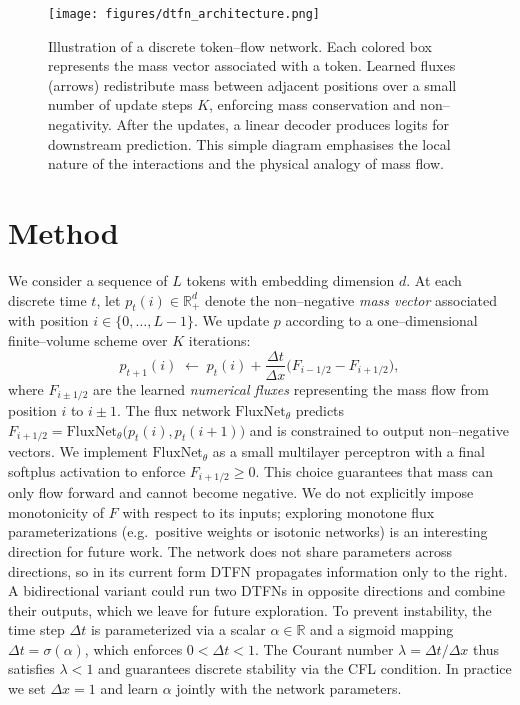 \documentclass[10pt]{article}
\begin{document}
\begin{figure}[t]
  \centering
  \texttt{[image: figures/dtfn\_architecture.png]}
  \caption{Illustration of a discrete token--flow network.  Each colored
    box represents the mass vector associated with a token.  Learned
    fluxes (arrows) redistribute mass between adjacent positions over a
    small number of update steps $K$, enforcing mass conservation and
    non--negativity.  After the updates, a linear decoder produces
    logits for downstream prediction.  This simple diagram emphasises
    the local nature of the interactions and the physical analogy of
    mass flow.}
  \label{fig:architecture}
\end{figure}


\section{Method}

We consider a sequence of $L$ tokens with embedding dimension $d$.
At each discrete time $t$, let $p_t(i)\in\mathbb{R}_+^d$ denote the non--negative
\emph{mass vector} associated with position $i\in\{0,\dots,L-1\}$.
We update $p$ according to a one--dimensional finite--volume scheme over
$K$ iterations:
\begin{equation}
  p_{t+1}(i) \;\leftarrow\; p_t(i) + \frac{\Delta t}{\Delta x}\bigl(F_{i-1/2} - F_{i+1/2}\bigr),
  \label{eq:update}
\end{equation}
where $F_{i\pm1/2}$ are the learned \emph{numerical fluxes} representing the
mass flow from position $i$ to $i\pm1$.  The flux network
$\mathrm{FluxNet}_\theta$ predicts $F_{i+1/2}= \mathrm{FluxNet}_\theta\bigl(p_t(i), p_t(i+1)\bigr)$
and is constrained to output non--negative vectors.  We implement
$\mathrm{FluxNet}_\theta$ as a small multilayer perceptron with a final
softplus activation to enforce $F_{i+1/2}\ge 0$.  This choice guarantees
that mass can only flow forward and cannot become negative.  We do not
explicitly impose monotonicity of $F$ with respect to its inputs; exploring
monotone flux parameterizations (e.g.~positive weights or isotonic
networks) is an interesting direction for future work.  The network does
not share parameters across directions, so in its current form DTFN
propagates information only to the right.  A bidirectional variant could
run two DTFNs in opposite directions and combine their outputs, which we
leave for future exploration.  To prevent instability, the time step $\Delta t$ is
parameterized via a scalar $\alpha\in\mathbb{R}$ and a sigmoid mapping
$\Delta t = \sigma(\alpha)$, which enforces $0<\Delta t<1$.  The Courant
number $\lambda=\Delta t/\Delta x$ thus satisfies $\lambda<1$ and
guarantees discrete stability via the CFL condition.  In practice we set
$\Delta x=1$ and learn $\alpha$ jointly with the network parameters.
\end{document}
